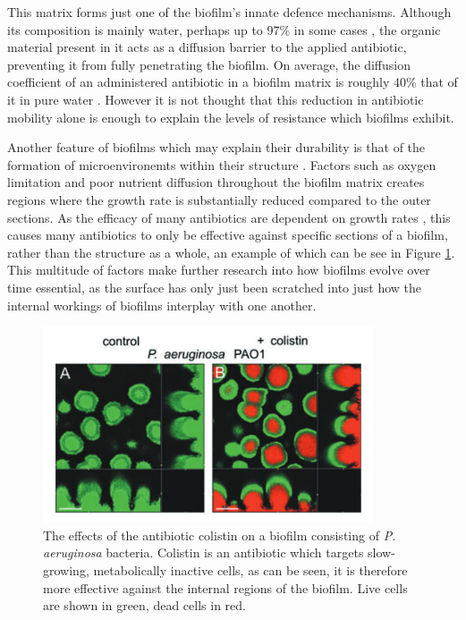 \documentclass[a4paper,12pt]{article}
\begin{document}
This matrix forms just one of the biofilm's innate defence mechanisms.  Although its composition is mainly water, perhaps up to 97\% in some cases 
\cite{bioref:Zhang-biofilm-water97pc-1998}, the organic material present in it acts as a diffusion barrier to the applied antibiotic, preventing it from fully penetrating 
the biofilm.  On average, the diffusion coefficient of an administered antibiotic in a biofilm matrix is roughly 40\% that of it in pure water 
\cite{bioref:Stewart-biofilm-diffusion-coeff-1998}.  However it is not thought that this reduction in antibiotic mobility alone is enough to explain the levels of resistance which 
biofilms exhibit.  

Another feature of biofilms which may explain their durability is that of the formation of microenvironemts within their structure \cite{bioref:Wimpenny-micrograds-1995}.  Factors such 
as oxygen limitation and poor nutrient diffusion throughout the biofilm matrix creates regions where the growth rate is substantially reduced compared to the outer sections.  As the 
efficacy of many antibiotics are dependent on growth rates \cite{bioref:Field-gr-depend-antib-2005}, this causes many antibiotics to only be effective against specific sections of 
a biofilm, rather than the structure as a whole, an example of which can be see in Figure \ref{fig:Pamp-dead-innards-biofilms}.  This multitude of factors make further research into how 
biofilms evolve over time essential, as the surface has only just been scratched into just how the internal workings of biofilms interplay with one another.

\begin{figure}[H]
 \centering
 \includegraphics[height=5.8cm]{Pamp-dead-biof-inside}
 \caption{The effects of the antibiotic colistin on a biofilm consisting of \textit{P. aeruginosa} bacteria.  Colistin is an antibiotic which targets slow-growing, metabolically 
 inactive cells, as can be seen, it is therefore more effective against the internal regions of the biofilm.  Live cells are shown in green, dead cells in red.}
 \label{fig:Pamp-dead-innards-biofilms}
\end{figure}
\end{document}
